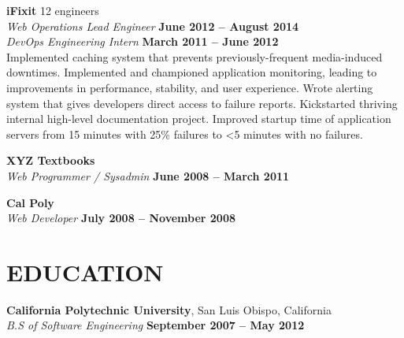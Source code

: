 \documentclass[margin,line]{resume}
\begin{document}
\begin{resume}
    \textbf{\listing iFixit} \hfill {\selectfont\texttildelow}12 engineers
    \vspace{2mm}\\\vspace{1mm}%
    \textsl{Web Operations Lead Engineer} \hfill \textbf{June 2012 -- August 2014}\\
    \textsl{DevOps Engineering Intern} \hfill \textbf{March 2011 -- June 2012}\\
    Implemented caching system that prevents previously-frequent media-induced downtimes.
    Implemented and championed application monitoring, leading to improvements in performance, stability, and user experience.
    Wrote alerting system that gives developers direct access to failure reports.
    Kickstarted thriving internal high-level documentation project.
    Improved startup time of application servers from 15 minutes with 25\% failures to \textless5 minutes with no failures.

    \textbf{\listing XYZ Textbooks} \vspace{2mm}\\\vspace{1mm}%
    \textsl{Web Programmer / Sysadmin} \hfill \textbf{June 2008 -- March 2011}

    \textbf{\listing Cal Poly} \vspace{2mm}\\\vspace{1mm}%
    \textsl{Web Developer} \hfill \textbf{July 2008 -- November 2008}

\sectionline

    \section{\mysidestyle \textbf{\large{E}\small{DUCATION}}}

    \textbf{\listing California Polytechnic University}, San Luis Obispo, California \vspace{1mm}\\
    \textsl{B.S of Software Engineering} \hfill \textbf{September 2007 -- May 2012}\vspace{-3mm}\\\vspace{-1mm}%

\sectionline


\end{resume}
\end{document}
